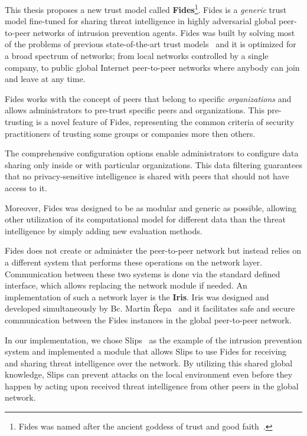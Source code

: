 This thesis proposes a new trust model called \textbf{Fides}\footnote{Fides was named after the ancient goddess of trust and good faith~\cite{enwiki:1086924565}.}.
Fides is a \textit{generic} trust model fine-tuned for sharing threat intelligence in highly adversarial global peer-to-peer networks of intrusion prevention agents.
Fides was built by solving most of the problems of previous state-of-the-art trust models~\cite{sort, dita} and it is optimized for a broad spectrum of networks; from local networks controlled by a single company, to public global Internet peer-to-peer networks where anybody can join and leave at any time.

Fides works with the concept of peers that belong to specific \textit{organizations} and allows administrators to pre-trust specific peers and organizations. This pre-trusting is a novel feature of Fides, representing the common criteria of security practitioners of trusting some groups or companies more then others. 

The comprehensive configuration options enable administrators to configure data sharing only inside or with particular organizations. This data filtering guarantees that no privacy-sensitive intelligence is shared with peers that should not have access to it.

Moreover, Fides was designed to be as modular and generic as possible, allowing other utilization of its computational model for different data than the threat intelligence by simply adding new evaluation methods.

Fides does not create or administer the peer-to-peer network but instead relies on a different system that performs these operations on the network layer.
Communication between these two systems is done via the standard defined interface, which allows replacing the network module if needed.
An implementation of such a network layer is the \textbf{Iris}. Iris was designed and developed simultaneously by Bc. Martin Řepa~\cite{nl} and it facilitates safe and secure communication between the Fides instances in the global peer-to-peer network.

In our implementation, we chose Slips~\cite{slips} as the example of the intrusion prevention system and implemented a module that allows Slips to use Fides for receiving and sharing threat intelligence over the network. 
By utilizing this shared global knowledge, Slips can prevent attacks on the local environment even before they happen by acting upon received threat intelligence from other peers in the global network.

